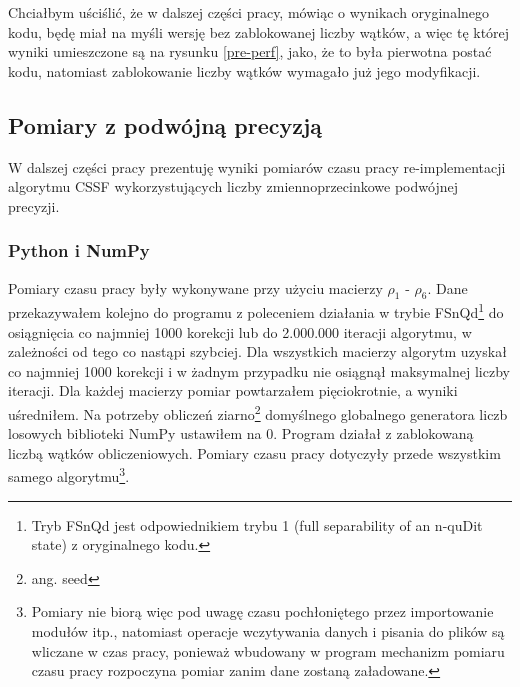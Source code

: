 \documentclass[11pt, a4paper]{article}
\begin{document}
\begin{sloppypar}
    Chciałbym uściślić, że w dalszej części pracy, mówiąc o wynikach oryginalnego kodu,
    będę miał na myśli wersję bez zablokowanej liczby wątków, a więc tę której wyniki umieszczone
    są na rysunku \ref{pre-perf}, jako, że to była pierwotna postać kodu, natomiast
    zablokowanie liczby wątków wymagało już jego modyfikacji.

    \subsection{Pomiary z podwójną precyzją}
    \label{plots-double-precision} W dalszej części pracy prezentuję wyniki pomiarów
    czasu pracy re-implementacji algorytmu CSSF wykorzystujących liczby
    zmiennoprzecinkowe podwójnej precyzji.

    \subsubsection{ Python i NumPy }
    Pomiary czasu pracy były wykonywane przy użyciu macierzy $\rho_{1}$ - $\rho_{6}$. Dane
    przekazywałem kolejno do programu z poleceniem działania w trybie FSnQd\footnote{Tryb
    FSnQd jest odpowiednikiem trybu 1 (full separability of an n-quDit state) z
    oryginalnego kodu.} do osiągnięcia co najmniej 1000 korekcji lub do 2.000.000 iteracji
    algorytmu, w zależności od tego co nastąpi szybciej. Dla wszystkich macierzy algorytm
    uzyskał co najmniej 1000 korekcji i w żadnym przypadku nie osiągnął maksymalnej liczby
    iteracji. Dla każdej macierzy pomiar powtarzałem pięciokrotnie, a wyniki uśredniłem.
    Na potrzeby obliczeń ziarno\footnote{ang. seed} domyślnego globalnego generatora liczb
    losowych biblioteki NumPy ustawiłem na 0. Program działał z zablokowaną liczbą wątków
    obliczeniowych. Pomiary czasu pracy dotyczyły przede wszystkim samego algorytmu\footnote{Pomiary
    nie biorą więc pod uwagę czasu pochłoniętego przez importowanie modułów itp., natomiast
    operacje wczytywania danych i pisania do plików są wliczane w czas pracy, ponieważ
    wbudowany w program mechanizm pomiaru czasu pracy rozpoczyna pomiar zanim dane
    zostaną załadowane.}.


\end{sloppypar}
\end{document}
